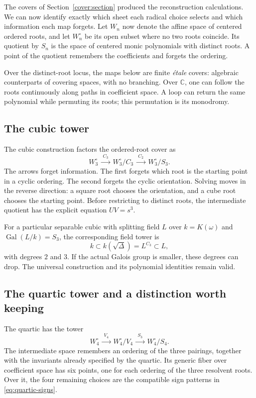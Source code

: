 \documentclass[11pt]{article}
\theoremstyle{remark}
\newcommand{\C}{\mathbb C}
\newcommand{\Gal}{\operatorname{Gal}}
\begin{document}
The covers of Section~\ref{cover:section} produced the reconstruction calculations. We can now identify exactly which sheet each radical choice selects and which information each map forgets. Let \(W_n\) now denote the affine space of centered ordered roots, and let \(W_n^\circ\) be its open subset where no two roots coincide. Its quotient by \(S_n\) is the space of centered monic polynomials with distinct roots. A point of the quotient remembers the coefficients and forgets the ordering.

Over the distinct-root locus, the maps below are finite \emph{\'{e}tale} covers: algebraic counterparts of covering spaces, with no branching. Over \(\C\), one can follow the roots continuously along paths in coefficient space. A loop can return the same polynomial while permuting its roots; this permutation is its monodromy.

\subsection{The cubic tower}

The cubic construction factors the ordered-root cover as
\begin{equation}
W_3^\circ\ \xrightarrow{\ C_3\ }\ W_3^\circ/C_3
\ \xrightarrow{\ C_2\ }\ W_3^\circ/S_3.
\label{eq:cubic-cover}
\end{equation}
The arrows forget information. The first forgets which root is the starting point in a cyclic ordering. The second forgets the cyclic orientation. Solving moves in the reverse direction: a square root chooses the orientation, and a cube root chooses the starting point. Before restricting to distinct roots, the intermediate quotient has the explicit equation \(UV=s^3\).

For a particular separable cubic with splitting field \(L\) over \(k=K(\omega)\) and \(\Gal(L/k)=S_3\), the corresponding field tower is
\[
k\subset k(\sqrt\Delta)=L^{C_3}\subset L,
\]
with degrees \(2\) and \(3\). If the actual Galois group is smaller, these degrees can drop. The universal construction and its polynomial identities remain valid.

\subsection{The quartic tower and a distinction worth keeping}

The quartic has the tower
\begin{equation}
W_4^\circ\ \xrightarrow{\ V_4\ }\ W_4^\circ/V_4
\ \xrightarrow{\ S_3\ }\ W_4^\circ/S_4.
\label{eq:quartic-cover}
\end{equation}
The intermediate space remembers an ordering of the three pairings, together with the invariants already specified by the quartic. Its generic fiber over coefficient space has six points, one for each ordering of the three resolvent roots. Over it, the four remaining choices are the compatible sign patterns in \eqref{eq:quartic-signs}.
\end{document}
